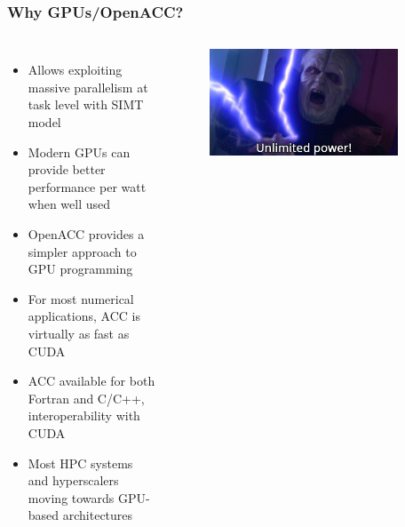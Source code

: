 \begin{frame}
	\frametitle{Why GPUs/OpenACC?}
	\begin{columns}
		\begin{itemize}
			\item Allows exploiting massive parallelism at task level with SIMT model
			\item Modern GPUs can provide better performance per watt when well used
			\item OpenACC provides a simpler approach to GPU programming
			\item For most numerical applications, ACC is virtually as fast as CUDA
			\item ACC available for both Fortran and C/C++, interoperability with CUDA
			\item Most HPC systems and hyperscalers moving towards GPU-based architectures
		\end{itemize}
		\begin{figure}
			\centering
			\includegraphics[width=0.9\textwidth]{images/palpatine.jpg}
		\end{figure}
	\end{columns}
\end{frame}